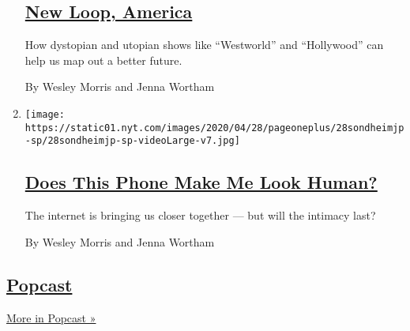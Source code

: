 \begin{enumerate}
  \hypertarget{new-loop-america}{%
  \subsection{\texorpdfstring{\href{/2020/05/14/podcasts/still-processing-westworld-hollywood-utopia-dystopia.html}{New
  Loop, America}}{New Loop, America}}\label{new-loop-america}}

  How dystopian and utopian shows like ``Westworld'' and ``Hollywood''
  can help us map out a better future.

  By Wesley Morris and Jenna Wortham
\item
  \texttt{[image: https://static01.nyt.com/images/2020/04/28/pageoneplus/28sondheimjp-sp/28sondheimjp-sp-videoLarge-v7.jpg]}

  \hypertarget{does-this-phone-make-me-look-human}{%
  \subsection{\texorpdfstring{\href{/2020/05/07/podcasts/still-processing-internet-vulnerability-sondheim-parks-recreation.html}{Does
  This Phone Make Me Look
  Human?}}{Does This Phone Make Me Look Human?}}\label{does-this-phone-make-me-look-human}}

  The internet is bringing us closer together --- but will the intimacy
  last?

  By Wesley Morris and Jenna Wortham
\end{enumerate}

\hypertarget{popcast}{%
\subsection{\texorpdfstring{\href{/column/popcast-pop-music-podcast}{Popcast}}{Popcast}}\label{popcast}}

\href{/column/popcast-pop-music-podcast}{More in Popcast »}

